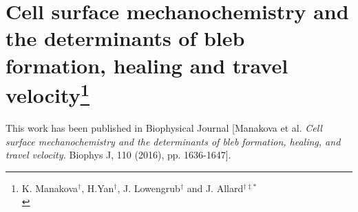 \renewcommand{\thefootnote}{$\star$} 
\chapter[Cellular blebs]{Cell surface mechanochemistry and the determinants of bleb formation, healing and travel velocity\footnote{K. Manakova$^\dag$, H.Yan$^\dag$, J. Lowengrub$^\dag$ and J. Allard$^{\dag\ddag\ast}$\\
}}\label{chap:cellbleb}












\vfill
This work has been published in Biophysical Journal [Manakova et al. \textit{Cell surface mechanochemistry and the determinants of bleb formation, healing, and travel velocity.} Biophys J, 110 (2016), pp. 1636-1647].